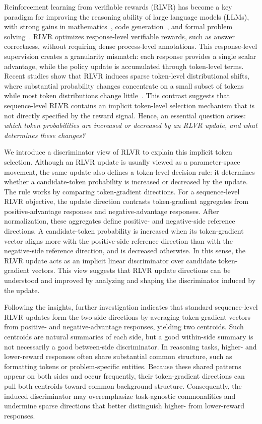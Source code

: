 \documentclass{llmxive}
\begin{document}
Reinforcement learning from verifiable rewards (RLVR) has become a key paradigm for improving the reasoning ability of large language models (LLMs), with strong gains in mathematics~\citep{shao2024deepseekmath,yang2024qwen2}, code generation~\citep{hui2024qwen2,shojaee2023execution,le2022coderl}, and formal problem solving~\citep{guo2025deepseek,team2025kimi}. 
RLVR optimizes response-level verifiable rewards, such as answer correctness, without requiring dense process-level annotations. 
This response-level supervision creates a granularity mismatch: each response provides a single scalar advantage, while the policy update is accumulated through token-level  terms. 
Recent studies show that RLVR induces sparse token-level distributional shifts, where substantial probability changes concentrate on a small subset of tokens while most token distributions change little~\citep{meng2026sparse,ma2026fipo}. 
This contrast suggests that sequence-level RLVR contains an implicit token-level selection mechanism that is not directly specified by the reward signal. 
Hence, an essential question arises: \textit{which token probabilities are increased or decreased by an RLVR update, and what determines these changes?}

We introduce a discriminator view of RLVR to explain this implicit token selection. 
Although an RLVR update is usually viewed as a parameter-space movement, the same update also defines a token-level decision rule: it determines whether a candidate-token probability is increased or decreased by the update.
The rule works by comparing token-gradient directions. 
For a sequence-level RLVR objective, the update direction contrasts token-gradient aggregates from positive-advantage responses and negative-advantage responses. 
After normalization, these aggregates define positive- and negative-side reference directions. 
A candidate-token probability is increased when its token-gradient vector aligns more with the positive-side reference direction than with the negative-side reference direction, and is decreased otherwise. In this sense, the RLVR update acts as an implicit linear discriminator over candidate token-gradient vectors. This view suggests that RLVR update directions can be understood and improved by analyzing and shaping the discriminator induced by the update.


Following the insights, further investigation indicates that standard sequence-level RLVR updates form the two-side directions by averaging token-gradient vectors from positive- and negative-advantage responses, yielding two centroids. 
Such centroids are natural summaries of each side, but a good within-side summary is not necessarily a good between-side discriminator. 
In reasoning tasks, higher- and lower-reward responses often share substantial common structure, such as formatting tokens or problem-specific entities. 
Because these shared patterns appear on both sides and occur frequently, their token-gradient directions can pull both centroids toward common background structure. 
Consequently, the induced discriminator may overemphasize task-agnostic commonalities and undermine sparse directions that better distinguish higher- from lower-reward responses.
\end{document}
